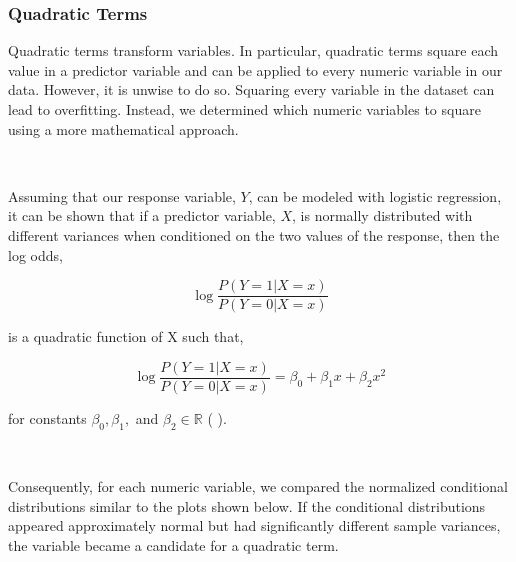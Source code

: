 \documentclass[10pt]{article}
\begin{document}
\subsubsection*{Quadratic Terms}

Quadratic terms transform variables. In particular, quadratic terms square each value in a predictor variable and can be applied to every numeric variable in our data. However, it is unwise to do so. Squaring every variable in the dataset can lead to overfitting. Instead, we determined which numeric variables to square using a more mathematical approach.

\

Assuming that our response variable, $Y$, can be modeled with logistic regression, it can be shown that if a predictor variable, $X$, is normally distributed with different variances when conditioned on the two values of the response, then the log odds,

$$\log\frac{P(Y=1 | X = x)}{P(Y=0 | X = x)}$$

is a quadratic function of X such that, 

$$\log\frac{P(Y=1 | X = x)}{P(Y=0 | X = x)} = \beta_0 + \beta_1 x + \beta_2 x^2$$

for constants $\beta_0, \beta_1,$ and $\beta_2 \in \mathbb{R}$ (\cite{kay} \cite{cook}). 

\

Consequently, for each numeric variable, we compared the normalized conditional distributions similar to the plots shown below. If the conditional distributions appeared approximately normal but had significantly different sample variances, the variable became a candidate for a quadratic term.

\begin{figure}[hbt!]
\hspace*{\fill}
\centering
{}\hspace{2em}
\hspace*{\fill}
\end{figure}
\end{document}
